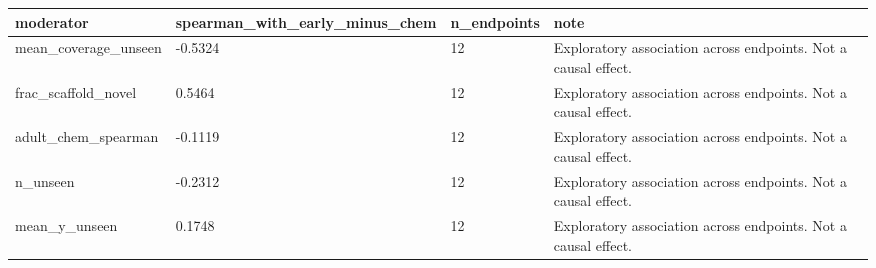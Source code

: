 \begin{tabular}{llll}
\hline
moderator & spearman\_with\_early\_minus\_chem & n\_endpoints & note \\
\hline
mean\_coverage\_unseen & -0.5324 & 12 & Exploratory association across endpoints. Not a causal effect. \\
frac\_scaffold\_novel & 0.5464 & 12 & Exploratory association across endpoints. Not a causal effect. \\
adult\_chem\_spearman & -0.1119 & 12 & Exploratory association across endpoints. Not a causal effect. \\
n\_unseen & -0.2312 & 12 & Exploratory association across endpoints. Not a causal effect. \\
mean\_y\_unseen & 0.1748 & 12 & Exploratory association across endpoints. Not a causal effect. \\
\hline
\end{tabular}

